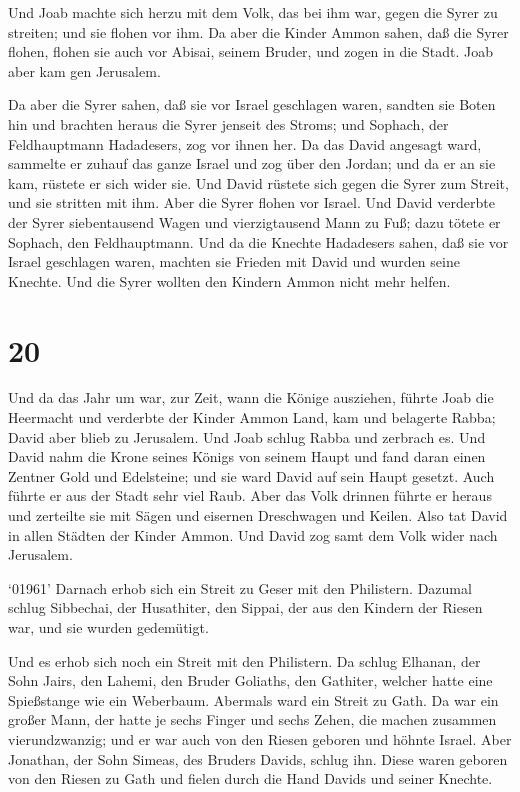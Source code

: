 Und Joab machte sich herzu mit dem Volk, das bei ihm war,
gegen die Syrer zu streiten; und sie flohen vor ihm.  Da
aber die Kinder Ammon sahen, daß die Syrer flohen, flohen sie auch vor
Abisai, seinem Bruder, und zogen in die Stadt. Joab aber kam gen
Jerusalem.

 Da aber die Syrer sahen, daß sie vor Israel geschlagen
waren, sandten sie Boten hin und brachten heraus die Syrer jenseit des
Stroms; und Sophach, der Feldhauptmann Hadadesers, zog vor ihnen her.
 Da das David angesagt ward, sammelte er zuhauf das ganze
Israel und zog über den Jordan; und da er an sie kam, rüstete er sich
wider sie. Und David rüstete sich gegen die Syrer zum Streit, und sie
stritten mit ihm.  Aber die Syrer flohen vor Israel. Und
David verderbte der Syrer siebentausend Wagen und vierzigtausend Mann zu
Fuß; dazu tötete er Sophach, den Feldhauptmann.  Und da die
Knechte Hadadesers sahen, daß sie vor Israel geschlagen waren, machten
sie Frieden mit David und wurden seine Knechte. Und die Syrer wollten
den Kindern Ammon nicht mehr helfen.

\hypertarget{section-19}{%
\section{20}\label{section-19}}

 Und da das Jahr um war, zur Zeit, wann die Könige
ausziehen, führte Joab die Heermacht und verderbte der Kinder Ammon
Land, kam und belagerte Rabba; David aber blieb zu Jerusalem. Und Joab
schlug Rabba und zerbrach es.  Und David nahm die Krone
seines Königs von seinem Haupt und fand daran einen Zentner Gold und
Edelsteine; und sie ward David auf sein Haupt gesetzt. Auch führte er
aus der Stadt sehr viel Raub.  Aber das Volk drinnen führte
er heraus und zerteilte sie mit Sägen und eisernen Dreschwagen und
Keilen. Also tat David in allen Städten der Kinder Ammon. Und David zog
samt dem Volk wider nach Jerusalem.

 `01961' Darnach erhob sich ein Streit zu Geser mit den
Philistern. Dazumal schlug Sibbechai, der Husathiter, den Sippai, der
aus den Kindern der Riesen war, und sie wurden gedemütigt.

 Und es erhob sich noch ein Streit mit den Philistern. Da
schlug Elhanan, der Sohn Jairs, den Lahemi, den Bruder Goliaths, den
Gathiter, welcher hatte eine Spießstange wie ein Weberbaum. 
Abermals ward ein Streit zu Gath. Da war ein großer Mann, der hatte je
sechs Finger und sechs Zehen, die machen zusammen vierundzwanzig; und er
war auch von den Riesen geboren  und höhnte Israel. Aber
Jonathan, der Sohn Simeas, des Bruders Davids, schlug ihn. 
Diese waren geboren von den Riesen zu Gath und fielen durch die Hand
Davids und seiner Knechte.

